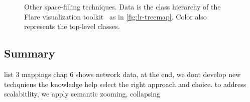 \begin{figure}[!htb]
\centering
{}
\hfill
{}

\vspace{.5\baselineskip}

\caption{Other space-filling techniques. Data is the class hierarchy of the Flare visualization toolkit~\cite{Heer2009b} as in \autoref{fig:lr-treemap}. Color also represents the top-level classes.}
\label{fig:lr-other-space-filling}
\end{figure}



\subsection{Summary}
list 3 mappings
chap 6 shows network data, at the end, we dont develop new techqnieus the knowledge help select the right approach and choice. to address scalabitlity, we apply semantic zooming, collapsing